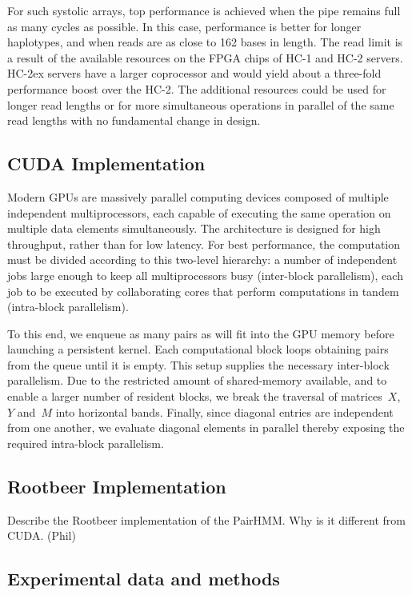 \documentclass[11pt, oneside]{article}
\begin{document}
	For such systolic arrays, top performance is achieved when the pipe remains
	full as many cycles as possible.  In this case, performance is better for
	longer haplotypes, and when reads are as close to 162 bases in length.  The
	read limit is a result of the available resources on the FPGA chips of HC-1
	and HC-2 servers.  HC-2ex servers have a larger coprocessor and would yield
	about a three-fold performance boost over the HC-2.  The additional
	resources could be used for longer read lengths or for more simultaneous
	operations in parallel of the same read lengths with no fundamental change
	in design.  

	
	\subsection{CUDA Implementation} 
	
	Modern GPUs are massively parallel computing devices composed of multiple
	independent multiprocessors, each capable of executing the same operation on
	multiple data elements simultaneously. The architecture is designed for high
	throughput, rather than for low latency.  For best performance, the
	computation must be divided according to this two-level hierarchy: a number
	of independent jobs large enough to keep all multiprocessors busy
	(inter-block parallelism), each job to be executed by collaborating cores
	that perform computations in tandem (intra-block parallelism).

	To this end, we enqueue as many pairs as will fit into the GPU memory before
	launching a persistent kernel.  Each computational block loops obtaining
	pairs from the queue until it is empty. This setup supplies the necessary
	inter-block parallelism.  Due to the restricted amount of shared-memory
	available, and to enable a larger number of resident blocks, we break the
	traversal of matrices~$X$, $Y$ and~$M$ into horizontal bands. Finally, since
	diagonal entries are independent from one another, we evaluate diagonal
	elements in parallel thereby exposing the required intra-block parallelism. 


	\subsection{Rootbeer Implementation} 
	
	Describe the Rootbeer implementation of the PairHMM. Why is it different from CUDA. (Phil) 
	
	\subsection{Experimental data and methods} 
	
\end{document}
